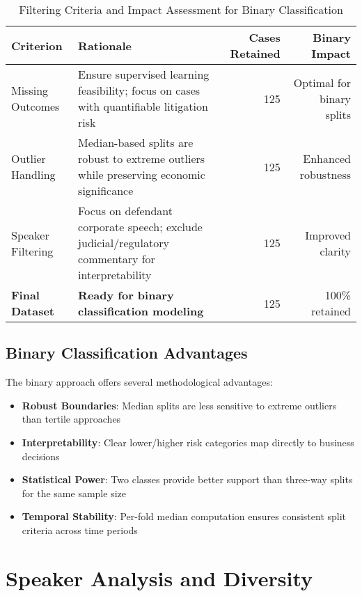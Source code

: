 \documentclass[11pt,a4paper]{article}
\begin{document}
\begin{table}[H]
\centering
\caption{Filtering Criteria and Impact Assessment for Binary Classification}
\begin{tabular}{p{3cm}p{6cm}rr}
\toprule
\textbf{Criterion} & \textbf{Rationale} & \textbf{Cases Retained} & \textbf{Binary Impact} \\
\midrule
Missing Outcomes & Ensure supervised learning feasibility; focus on cases with quantifiable litigation risk & 125 & Optimal for binary splits \\
Outlier Handling & Median-based splits are robust to extreme outliers while preserving economic significance & 125 & Enhanced robustness \\
Speaker Filtering & Focus on defendant corporate speech; exclude judicial/regulatory commentary for interpretability & 125 & Improved clarity \\
\midrule
\textbf{Final Dataset} & \textbf{Ready for binary classification modeling} & 125 & 100\% retained \\
\bottomrule
\end{tabular}
\end{table}

\subsection{Binary Classification Advantages}

The binary approach offers several methodological advantages:

\begin{itemize}
\item \textbf{Robust Boundaries}: Median splits are less sensitive to extreme outliers than tertile approaches
\item \textbf{Interpretability}: Clear lower/higher risk categories map directly to business decisions
\item \textbf{Statistical Power}: Two classes provide better support than three-way splits for the same sample size
\item \textbf{Temporal Stability}: Per-fold median computation ensures consistent split criteria across time periods
\end{itemize}



\section{Speaker Analysis and Diversity}
\end{document}
